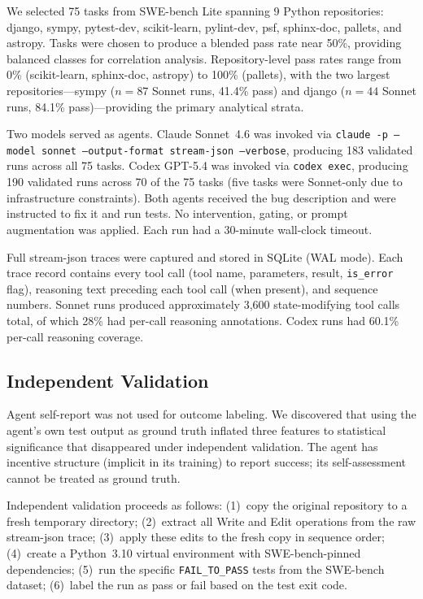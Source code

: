 \documentclass[11pt]{article}
\begin{document}
We selected 75 tasks from SWE-bench Lite \citep{jimenez2024swebench} spanning 9 Python repositories: django, sympy, pytest-dev, scikit-learn, pylint-dev, psf, sphinx-doc, pallets, and astropy.
Tasks were chosen to produce a blended pass rate near 50\%, providing balanced classes for correlation analysis.
Repository-level pass rates range from 0\% (scikit-learn, sphinx-doc, astropy) to 100\% (pallets), with the two largest repositories---sympy ($n = 87$ Sonnet runs, 41.4\% pass) and django ($n = 44$ Sonnet runs, 84.1\% pass)---providing the primary analytical strata.

Two models served as agents.
Claude Sonnet~4.6 was invoked via {\small\texttt{claude -p --model sonnet --output-format stream-json --verbose}}, producing 183 validated runs across all 75 tasks.
Codex GPT-5.4 was invoked via \texttt{codex exec}, producing 190 validated runs across 70 of the 75 tasks (five tasks were Sonnet-only due to infrastructure constraints).
Both agents received the bug description and were instructed to fix it and run tests.
No intervention, gating, or prompt augmentation was applied.
Each run had a 30-minute wall-clock timeout.

Full stream-json traces were captured and stored in SQLite (WAL mode).
Each trace record contains every tool call (tool name, parameters, result, \texttt{is\_error} flag), reasoning text preceding each tool call (when present), and sequence numbers.
Sonnet runs produced approximately 3,600 state-modifying tool calls total, of which 28\% had per-call reasoning annotations.
Codex runs had 60.1\% per-call reasoning coverage.

\subsection{Independent Validation}

Agent self-report was not used for outcome labeling.
We discovered that using the agent's own test output as ground truth inflated three features to statistical significance that disappeared under independent validation.
The agent has incentive structure (implicit in its training) to report success; its self-assessment cannot be treated as ground truth.

Independent validation proceeds as follows: (1)~copy the original repository to a fresh temporary directory; (2)~extract all Write and Edit operations from the raw stream-json trace; (3)~apply these edits to the fresh copy in sequence order; (4)~create a Python~3.10 virtual environment with SWE-bench-pinned dependencies; (5)~run the specific \texttt{FAIL\_TO\_PASS} tests from the SWE-bench dataset; (6)~label the run as pass or fail based on the test exit code.
\end{document}
